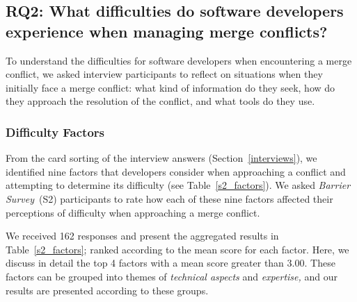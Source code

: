 
\subsection{\textbf{RQ2:} What difficulties do software developers experience when managing merge conflicts?}\label{RQ2}

To understand the difficulties for software developers when encountering a merge conflict, we asked interview participants to reflect on situations when they initially face a merge conflict: what kind of information do they seek, how do they approach the resolution of the conflict, and what tools do they use. 

\subsubsection{Difficulty Factors}\label{difficulty-factors}

From the card sorting of the interview answers (Section~\ref{interviews}), we identified nine factors that developers consider when approaching a conflict and attempting to determine its difficulty (see Table~\ref{s2_factors}). 
We asked \textit{Barrier Survey}~(S2) participants to rate how each of these nine factors affected their perceptions of difficulty when approaching a merge conflict.

We received 162 responses and present the aggregated results in Table~\ref{s2_factors}; ranked according to the mean score for each factor.
Here, we discuss in detail the top 4 factors with a mean score greater than $3.00$.
These factors can be grouped into themes of \textit{technical aspects} and \textit{expertise,} and our results are presented according to these groups.

